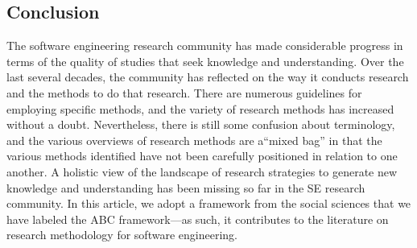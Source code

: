 \documentclass[runningheads]{llncs}
\begin{document}
\subsection{Conclusion}
The software engineering research community has made considerable progress in terms of the quality of studies that seek knowledge and understanding. Over the last several decades, the community has reflected on the way it conducts research and the methods to do that research. There are numerous guidelines for employing specific methods, and the variety of research methods has increased without a doubt. Nevertheless, there is still some confusion about terminology, and the
various overviews of research methods are a“mixed bag” in that the various methods identified have not been carefully positioned in relation to one another. A holistic view of the landscape of research strategies to generate new knowledge and understanding has been missing so far in the SE research community. In this article, we adopt a framework from the social sciences that we have labeled the ABC framework—as such, it contributes to the literature on research methodology for
software engineering.
%
%
%
% 
% 
%
\end{document}
